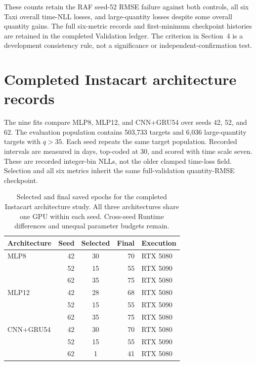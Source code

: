 \documentclass[runningheads]{llncs}
\begin{document}
These counts retain the RAF seed-52 RMSE failure against both controls, all six Taxi overall time-NLL losses, and large-quantity losses despite some overall quantity gains. The full six-metric records and first-minimum checkpoint histories are retained in the completed Validation ledger. The criterion in Section~4 is a development consistency rule, not a significance or independent-confirmation test.

\clearpage
\section{Completed Instacart architecture records}
\label{app:instacart-completed}
The nine fits compare MLP8, MLP12, and CNN+GRU54 over seeds 42, 52, and 62. The evaluation population contains 503,733 targets and 6,036 large-quantity targets with $q>35$. Each seed repeats the same target population. Recorded intervals are measured in days, top-coded at 30, and scored with time scale seven. These are recorded integer-bin NLLs, not the older clamped time-loss field. Selection and all six metrics inherit the same full-validation quantity-RMSE checkpoint.

\begin{table}[htbp]
\caption{Selected and final saved epochs for the completed Instacart architecture study. All three architectures share one GPU within each seed. Cross-seed Runtime differences and unequal parameter budgets remain.}
\label{tab:instacart-epochs}
\centering\small
\begin{tabular}{@{}lrcrl@{}}
\toprule
Architecture & Seed & Selected & Final & Execution\\
\midrule
MLP8 & 42 & 30 & 70 & RTX 5080\\
 & 52 & 15 & 55 & RTX 5090\\
 & 62 & 35 & 75 & RTX 5080\\
\midrule
MLP12 & 42 & 28 & 68 & RTX 5080\\
 & 52 & 15 & 55 & RTX 5090\\
 & 62 & 35 & 75 & RTX 5080\\
\midrule
CNN+GRU54 & 42 & 30 & 70 & RTX 5080\\
 & 52 & 15 & 55 & RTX 5090\\
 & 62 & 1 & 41 & RTX 5080\\
\bottomrule
\end{tabular}
\end{table}
\end{document}
